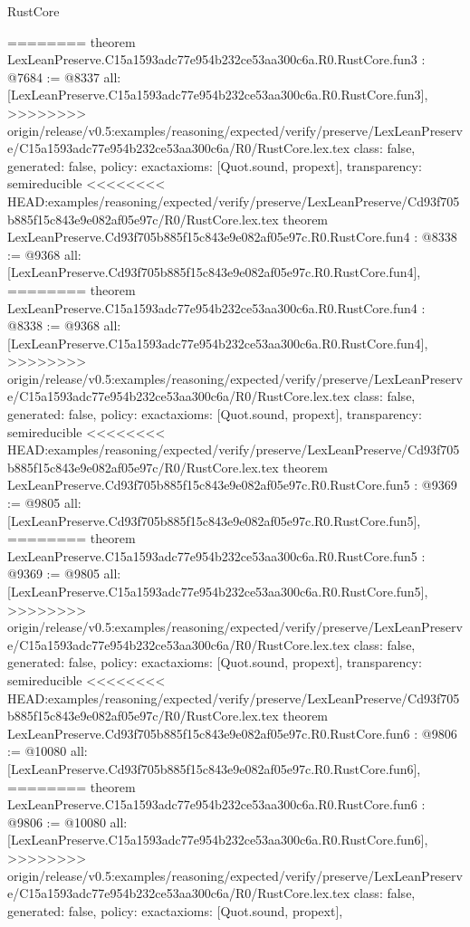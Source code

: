 \begin{lexlean}{RustCore}
\begin{coremodule}
{\begin{coremodule}
{{{{{{========
theorem LexLeanPreserve.C15a1593adc77e954b232ce53aa300c6a.R0.RustCore.fun3 : @7684 := @8337 {
  all: [LexLeanPreserve.C15a1593adc77e954b232ce53aa300c6a.R0.RustCore.fun3],
>>>>>>>> origin/release/v0.5:examples/reasoning/expected/verify/preserve/LexLeanPreserve/C15a1593adc77e954b232ce53aa300c6a/R0/RustCore.lex.tex
  class: false,
  generated: false,
  policy: exact{axioms: [Quot.sound, propext]},
  transparency: semireducible
}
<<<<<<<< HEAD:examples/reasoning/expected/verify/preserve/LexLeanPreserve/Cd93f705b885f15c843e9e082af05e97c/R0/RustCore.lex.tex
theorem LexLeanPreserve.Cd93f705b885f15c843e9e082af05e97c.R0.RustCore.fun4 : @8338 := @9368 {
  all: [LexLeanPreserve.Cd93f705b885f15c843e9e082af05e97c.R0.RustCore.fun4],
========
theorem LexLeanPreserve.C15a1593adc77e954b232ce53aa300c6a.R0.RustCore.fun4 : @8338 := @9368 {
  all: [LexLeanPreserve.C15a1593adc77e954b232ce53aa300c6a.R0.RustCore.fun4],
>>>>>>>> origin/release/v0.5:examples/reasoning/expected/verify/preserve/LexLeanPreserve/C15a1593adc77e954b232ce53aa300c6a/R0/RustCore.lex.tex
  class: false,
  generated: false,
  policy: exact{axioms: [Quot.sound, propext]},
  transparency: semireducible
}
<<<<<<<< HEAD:examples/reasoning/expected/verify/preserve/LexLeanPreserve/Cd93f705b885f15c843e9e082af05e97c/R0/RustCore.lex.tex
theorem LexLeanPreserve.Cd93f705b885f15c843e9e082af05e97c.R0.RustCore.fun5 : @9369 := @9805 {
  all: [LexLeanPreserve.Cd93f705b885f15c843e9e082af05e97c.R0.RustCore.fun5],
========
theorem LexLeanPreserve.C15a1593adc77e954b232ce53aa300c6a.R0.RustCore.fun5 : @9369 := @9805 {
  all: [LexLeanPreserve.C15a1593adc77e954b232ce53aa300c6a.R0.RustCore.fun5],
>>>>>>>> origin/release/v0.5:examples/reasoning/expected/verify/preserve/LexLeanPreserve/C15a1593adc77e954b232ce53aa300c6a/R0/RustCore.lex.tex
  class: false,
  generated: false,
  policy: exact{axioms: [Quot.sound, propext]},
  transparency: semireducible
}
<<<<<<<< HEAD:examples/reasoning/expected/verify/preserve/LexLeanPreserve/Cd93f705b885f15c843e9e082af05e97c/R0/RustCore.lex.tex
theorem LexLeanPreserve.Cd93f705b885f15c843e9e082af05e97c.R0.RustCore.fun6 : @9806 := @10080 {
  all: [LexLeanPreserve.Cd93f705b885f15c843e9e082af05e97c.R0.RustCore.fun6],
========
theorem LexLeanPreserve.C15a1593adc77e954b232ce53aa300c6a.R0.RustCore.fun6 : @9806 := @10080 {
  all: [LexLeanPreserve.C15a1593adc77e954b232ce53aa300c6a.R0.RustCore.fun6],
>>>>>>>> origin/release/v0.5:examples/reasoning/expected/verify/preserve/LexLeanPreserve/C15a1593adc77e954b232ce53aa300c6a/R0/RustCore.lex.tex
  class: false,
  generated: false,
  policy: exact{axioms: [Quot.sound, propext]},
}}}}}}}}}}
\end{coremodule}}
\end{coremodule}
\end{lexlean}

